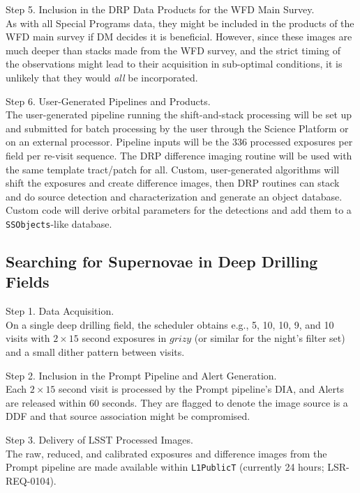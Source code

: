 \documentclass[DM,lsstdoc,toc]{lsstdoc}
\begin{document}
Step 5. Inclusion in the DRP Data Products for the WFD Main Survey. \\
As with all Special Programs data, they might be included in the products of the WFD main survey if DM decides it is beneficial. However, since these images are much deeper than stacks made from the WFD survey, and the strict timing of the observations might lead to their acquisition in sub-optimal conditions, it is unlikely that they would \textit{all} be incorporated.

Step 6. User-Generated Pipelines and Products. \\
The user-generated pipeline running the shift-and-stack processing will be set up and submitted for batch processing by the user through the Science Platform or on an external processor. Pipeline inputs will be the 336 processed exposures per field per re-visit sequence. The DRP difference imaging routine will be used with the same template tract/patch for all. Custom, user-generated algorithms will shift the exposures and create difference images, then DRP routines can stack and do source detection and characterization and generate an object database. Custom code will derive orbital parameters for the detections and add them to a {\tt SSObjects}-like database.


\subsection{Searching for Supernovae in Deep Drilling Fields}\label{ssec:SPCS_SNDDF}

Step 1. Data Acquisition. \\
On a single deep drilling field, the scheduler obtains e.g., 5, 10, 10, 9, and 10 visits with $2\times15$ second exposures in $grizy$ (or similar for the night's filter set) and a small dither pattern between visits.

Step 2. Inclusion in the Prompt Pipeline and Alert Generation. \\
Each $2\times15$ second visit is processed by the Prompt pipeline's DIA, and Alerts are released within 60 seconds. They are flagged to denote the image source is a DDF and that source association might be compromised.

Step 3. Delivery of LSST Processed Images. \\
The raw, reduced, and calibrated exposures and difference images from the Prompt pipeline are made available within \texttt{L1PublicT} (currently 24 hours; LSR-REQ-0104).
\end{document}
